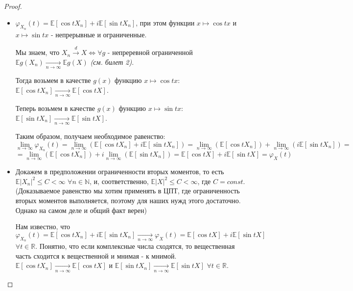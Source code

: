 \begin{proof}
    \text{}
    \renewcommand{\labelitemi}{$\boldsymbol{\Rightarrow}$}
    \begin{itemize}
        \item \text{}
        
        $\varphi_{X_n}(t) = \mathbb{E}[\cos{tX_n}] + i\mathbb{E}[\sin{tX_n}]$, при этом функции $x \mapsto \cos{tx}$ и $x \mapsto \sin{tx}$ - непрерывные и ограниченные.
        
        Мы знаем, что $X_n \xrightarrow{d} X \Leftrightarrow \forall g$ - непреревной ограниченной $\mathbb{E}g(X_n) \xrightarrow[n \rightarrow \infty]{} \mathbb{E}g(X)$ \textit{(см. билет 2)}.
        
        Тогда возьмем в качестве $g(x)$ функцию $x \mapsto \cos{tx}$: $\mathbb{E}[\cos{tX_n}] \xrightarrow[n \rightarrow \infty]{} \mathbb{E}[\cos{tX}]$.
        
        Теперь возьмем в качестве $g(x)$ функцию $x \mapsto \sin{tx}$: $\mathbb{E}[\sin{tX_n}] \xrightarrow[n \rightarrow \infty]{} \mathbb{E}[\sin{tX}]$.
        
        Таким образом, получаем необходимое равенство:
        $$\lim_{n \to \infty} \varphi_{X_n}(t) = \lim_{n \to \infty} (\mathbb{E}[\cos{tX_n}] + i\mathbb{E}[\sin{tX_n}]) = \lim_{n \to \infty} (\mathbb{E}[\cos{tX_n}]) + \lim_{n \to \infty} (i\mathbb{E}[\sin{tX_n}]) =$$
        $$= \lim_{n \to \infty} (\mathbb{E}[\cos{tX_n}]) + i\lim_{n \to \infty} (\mathbb{E}[\sin{tX_n}]) = \mathbb{E}[\cos{tX}] + i\mathbb{E}[\sin{tX}] = \varphi_{X}(t)$$
    \end{itemize}
    
    \renewcommand{\labelitemi}{$\boldsymbol{\Leftarrow}$}
    \begin{itemize}
        \item \text{}
        
        Докажем в предположении ограниченности вторых моментов, то есть $\mathbb{E}|X_n|^2 \leq C < \infty$ $\forall n \in \mathbb{N}$, и, соответственно, $\mathbb{E}|X|^2 \leq C < \infty$, где $C = const$. (Доказываемое равенство мы хотим применять в ЦПТ, где ограниченность вторых моментов выполняется, поэтому для наших нужд этого достаточно. Однако на самом деле и общий факт верен)
        
        Нам известно, что $\varphi_{X_n}(t) = \mathbb{E}[\cos{tX_n}] + i\mathbb{E}[\sin{tX_n}] \xrightarrow[n \rightarrow \infty]{} \varphi_{X}(t) = \mathbb{E}[\cos{tX}] + i\mathbb{E}[\sin{tX}]$ $\forall t \in \mathbb{R}$. Понятно, что если комплексные числа сходятся, то вещественная часть сходится к вещественной и мнимая - к мнимой. $\mathbb{E}[\cos{tX_n}] \xrightarrow[n \rightarrow \infty]{} \mathbb{E}[\cos{tX}]$ и $ \mathbb{E}[\sin{tX_n}] \xrightarrow[n \rightarrow \infty]{} \mathbb{E}[\sin{tX}]$ $\forall t \in \mathbb{R}$.
        

\end{itemize}
\end{proof}

